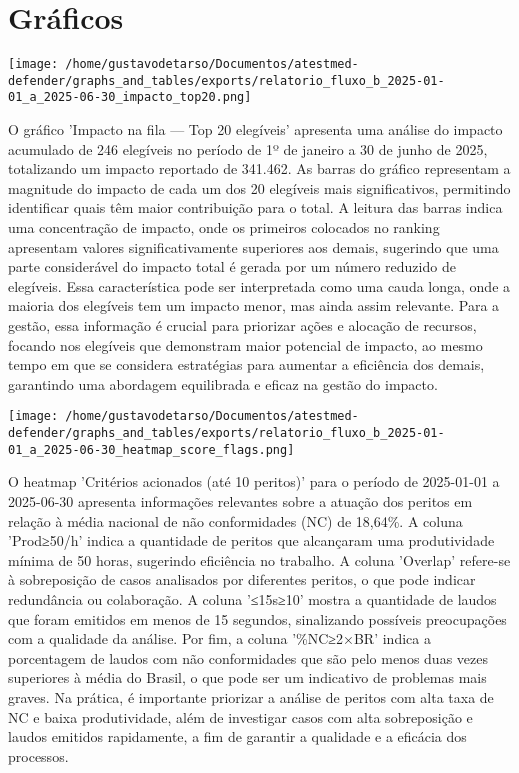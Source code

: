 \documentclass[11pt]{article}
\begin{document}
\section{Gráficos}
\label{sec:orgf71b134}
\begin{center}
\texttt{[image: /home/gustavodetarso/Documentos/atestmed-defender/graphs\_and\_tables/exports/relatorio\_fluxo\_b\_2025-01-01\_a\_2025-06-30\_impacto\_top20.png]}
\end{center}
O gráfico 'Impacto na fila — Top 20 elegíveis' apresenta uma análise do impacto acumulado de 246 elegíveis no período de 1º de janeiro a 30 de junho de 2025, totalizando um impacto reportado de 341.462. As barras do gráfico representam a magnitude do impacto de cada um dos 20 elegíveis mais significativos, permitindo identificar quais têm maior contribuição para o total. A leitura das barras indica uma concentração de impacto, onde os primeiros colocados no ranking apresentam valores significativamente superiores aos demais, sugerindo que uma parte considerável do impacto total é gerada por um número reduzido de elegíveis. Essa característica pode ser interpretada como uma cauda longa, onde a maioria dos elegíveis tem um impacto menor, mas ainda assim relevante. Para a gestão, essa informação é crucial para priorizar ações e alocação de recursos, focando nos elegíveis que demonstram maior potencial de impacto, ao mesmo tempo em que se considera estratégias para aumentar a eficiência dos demais, garantindo uma abordagem equilibrada e eficaz na gestão do impacto.
\begin{center}
\texttt{[image: /home/gustavodetarso/Documentos/atestmed-defender/graphs\_and\_tables/exports/relatorio\_fluxo\_b\_2025-01-01\_a\_2025-06-30\_heatmap\_score\_flags.png]}
\end{center}
O heatmap 'Critérios acionados (até 10 peritos)' para o período de 2025-01-01 a 2025-06-30 apresenta informações relevantes sobre a atuação dos peritos em relação à média nacional de não conformidades (NC) de 18,64\%. A coluna 'Prod≥50/h' indica a quantidade de peritos que alcançaram uma produtividade mínima de 50 horas, sugerindo eficiência no trabalho. A coluna 'Overlap' refere-se à sobreposição de casos analisados por diferentes peritos, o que pode indicar redundância ou colaboração. A coluna '≤15s≥10' mostra a quantidade de laudos que foram emitidos em menos de 15 segundos, sinalizando possíveis preocupações com a qualidade da análise. Por fim, a coluna '\%NC≥2×BR' indica a porcentagem de laudos com não conformidades que são pelo menos duas vezes superiores à média do Brasil, o que pode ser um indicativo de problemas mais graves. Na prática, é importante priorizar a análise de peritos com alta taxa de NC e baixa produtividade, além de investigar casos com alta sobreposição e laudos emitidos rapidamente, a fim de garantir a qualidade e a eficácia dos processos.
\end{document}
